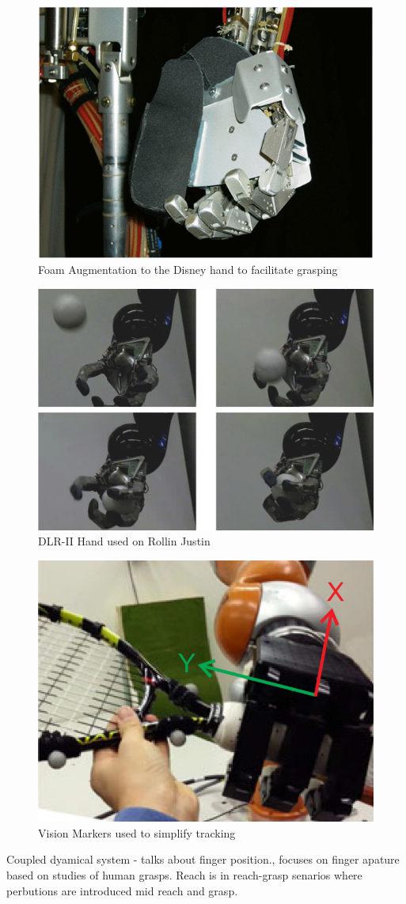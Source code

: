 \begin{figure}
    \centering
    \includegraphics[width=.4\textwidth]{Images/DisneyFoam.png}
    \caption{Foam Augmentation to the Disney hand to facilitate grasping \cite{DisneyRobot}}
    \label{fig:DisneyFoam}
\end{figure}
\begin{figure}
    \centering
    \includegraphics[width=.4\textwidth]{Images/RollingJustinHand.png}
    \caption{DLR-II Hand used on Rollin Justin \cite{RollinJustin}}
    \label{fig:RollingJustinHand}
\end{figure}
\begin{figure}
    \centering
    \includegraphics[width=.4\textwidth]{Images/VisionMarkersTennisRacket.png}
    \caption{Vision Markers used to simplify tracking \cite{TennisRacket}}
    \label{fig:VisionMarkersTennis}
\end{figure}

Coupled dyamical system - talks about finger position., focuses on finger apature based on studies of human grasps. Reach is in reach-grasp senarios where perbutions are introduced mid reach and grasp. \cite{Shukla2012}



